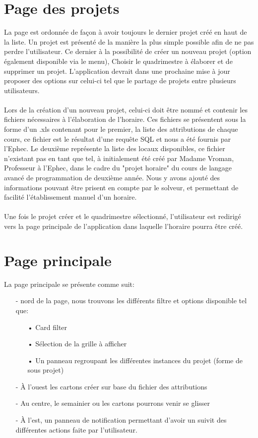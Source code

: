 \section{Page des projets}
La page est ordonnée de façon à avoir toujours le dernier projet créé en haut de la liste. Un projet est présenté de la manière la plus simple possible afin de ne pas perdre l'utilisateur. Ce dernier à la possibilité de créer un nouveau projet (option également disponible via le menu), Choisir le quadrimestre à élaborer et de supprimer un projet. L'application devrait dans une prochaine mise à jour proposer des options sur celui-ci tel que le partage de projets entre plusieurs utilisateurs.\\
\\
Lors de la création d'un nouveau projet, celui-ci doit être nommé et contenir les fichiers nécessaires à l'élaboration de l'horaire. Ces fichiers se présentent sous la forme d'un .xls contenant pour le premier, la liste des attributions de chaque cours, ce fichier est le résultat d'une requête SQL et nous a été fournis par l'Ephec. Le deuxième représente la liste des locaux disponibles, ce fichier n'existant pas en tant que tel, à initialement été créé par Madame Vroman, Professeur à l'Ephec, dans le cadre du "projet horaire" du cours de langage avancé de programmation de deuxième année. Nous y avons ajouté des informations pouvant être prisent en compte par le solveur, et permettant de facilité l'établissement manuel d'un horaire.\\
\\
Une fois le projet créer et le quadrimestre sélectionné, l'utilisateur est redirigé vers la page principale de l'application dans laquelle l'horaire pourra être créé.

\section{Page principale}
La page principale se présente comme suit:\\

\begin{itemize}	
	
	\item[-] nord de la page, nous trouvons les différents filtre et options disponible tel que:\\
	\begin{itemize}
		\item[•] Card filter
		\item[•] Sélection de la grille à afficher
		\item[•] Un panneau regroupant les différentes instances du projet (forme de sous projet)\\
	\end{itemize}
	\item[-] À l'ouest les cartons créer sur base du fichier des attributions\\
	\item[-] Au centre, le semainier ou les cartons pourrons venir se glisser\\
	\item[-] À l'est, un panneau de notification permettant d'avoir un suivit des différentes actions faite par l'utilisateur.
\end{itemize}
